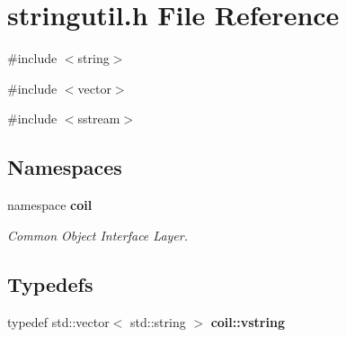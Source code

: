 \section{stringutil.h File Reference}
\label{stringutil_8h}
{\ttfamily \#include $<$string$>$}\par
{\ttfamily \#include $<$vector$>$}\par
{\ttfamily \#include $<$sstream$>$}\par
\subsection*{Namespaces}
\begin{DoxyCompactItemize}
\item 
namespace {\bf coil}


\begin{DoxyCompactList}\small\item\em Common Object Interface Layer. \item\end{DoxyCompactList}

\end{DoxyCompactItemize}
\subsection*{Typedefs}
\begin{DoxyCompactItemize}
\item 
typedef std::vector$<$ std::string $>$ {\bf coil::vstring}
\end{DoxyCompactItemize}

